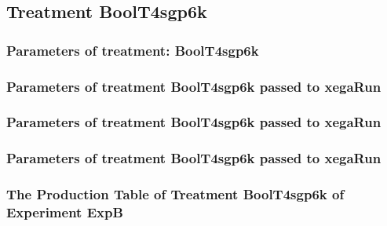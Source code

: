 \documentclass[18pt,c]{beamer}
\makeatletter
\def\beamer@writeslidentry@miniframesoff{%
  \expandafter\beamer@ifempty\expandafter{\beamer@framestartpage}{}%
  {%
   \clearpage\beamer@notesactions%
  }
}
\newcommand*{\miniframesoff}{\let\beamer@writeslidentry=\beamer@writeslidentry@miniframesoff}
\makeatother
\begin{document}
\miniframesoff
\subsection{Treatment BoolT4sgp6k}

 \begin{frame}
 \fontsize{8pt}{9pt}\selectfont
 \frametitle{  Parameters of treatment: BoolT4sgp6k 
 }

 \label{ExpBtParmTable096.tex}  
 \end{frame}


 \begin{frame}
 \fontsize{8pt}{9pt}\selectfont
 \frametitle{  Parameters of treatment BoolT4sgp6k passed to xegaRun
 }

 \label{ExpBtParmTable097.tex}  
 \end{frame}


 \begin{frame}
 \fontsize{8pt}{9pt}\selectfont
 \frametitle{  Parameters of treatment BoolT4sgp6k passed to xegaRun
 }

 \label{ExpBtParmTable098.tex}  
 \end{frame}


 \begin{frame}
 \fontsize{8pt}{9pt}\selectfont
 \frametitle{  Parameters of treatment BoolT4sgp6k passed to xegaRun
 }

 \label{ExpBtParmTable099.tex}  
 \end{frame}

 \begin{frame}
 \fontsize{8pt}{9pt}\selectfont
 \frametitle{ The Production Table of Treatment BoolT4sgp6k of Experiment ExpB }

 \label{ExpBGrammarTable032.tex}  
 \end{frame}
\end{document}
